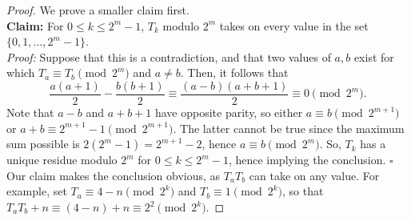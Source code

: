 \documentclass[10pt,a4paper]{amsart}
\begin{document}
\begin{proof}
    We prove a smaller claim first.
\\

    \textbf{Claim:} For $0 \le k \le 2^{m}-1$, $T_k$ modulo $2^m$ takes on every value in the set $\{0, 1, \dots, 2^m - 1\}$. 
    \\

    \emph{Proof:} Suppose that this is a contradiction, and that two values of $a,b$ exist for which $T_a \equiv T_b \pmod{2^m}$ and $a \neq b$. Then, it follows that $$\frac{a(a+1)}{2} - \frac{b(b+1)}{2} \equiv \frac{(a-b)(a+b+1)}{2} \equiv 0 \pmod{2^m}.$$ Note that $a-b$ and $a+b+1$ have opposite parity, so either $a \equiv b \pmod{2^{m+1}}$ or $a + b \equiv 2^{m+1} - 1 \pmod{2^{m+1}}$. The latter cannot be true since the maximum sum possible is $2 \left(2^{m} - 1 \right) = 2^{m+1} - 2$, hence $a \equiv b \pmod{2^m}$. So, $T_k$ has a unique residue modulo $2^m$ for $0 \le k \le 2^{m} - 1$, hence implying the conclusion. \quad\quad\quad\quad\quad\quad\quad\quad\quad\quad\quad\quad\quad\quad\quad\quad\quad $\square$
    \\ 
   
    Our claim makes the conclusion obvious, as $T_a T_b$ can take on any value. For example, set $T_a \equiv 4-n \pmod{2^k}$ and $T_b \equiv 1 \pmod{2^k}$, so that $T_a T_b + n \equiv (4-n) + n \equiv 2^2 \pmod{2^k}$. 
\end{proof}
\end{document}
